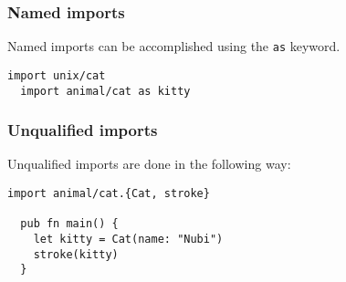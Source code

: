 \vs
\subsubsection*{\rmfamily Named imports}
Named imports can be accomplished using the 
\lstinline[language=Gleam, basicstyle=\small]!as! keyword.

\begin{lstlisting}[belowskip=-\baselineskip]
  import unix/cat
  import animal/cat as kitty  
\end{lstlisting}

\vs
\subsubsection*{\rmfamily Unqualified imports}

Unqualified imports are done in the following way:

\begin{lstlisting}[belowskip=-\baselineskip]
  import animal/cat.{Cat, stroke}

  pub fn main() {
    let kitty = Cat(name: "Nubi")
    stroke(kitty)
  }
\end{lstlisting}
